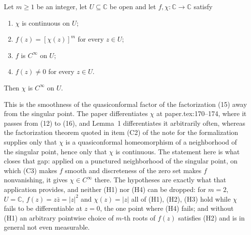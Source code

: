 \begin{lemma}
Let $m\ge1$ be an integer, let $U\subseteq\mathbb{C}$ be open and let
$f,\chi\colon\mathbb{C}\to\mathbb{C}$ satisfy
\begin{enumerate}
\item[(H1)] $\chi$ is continuous on $U$;
\item[(H2)] $f(z)=[\chi(z)]^{m}$ for every $z\in U$;
\item[(H3)] $f$ is $C^\infty$ on $U$;
\item[(H4)] $f(z)\neq0$ for every $z\in U$.
\end{enumerate}
Then $\chi$ is $C^\infty$ on $U$.

This is the smoothness of the quasiconformal factor of the factorization (15)
away from the singular point.  The paper differentiates $\chi$ at
paper.tex:170--174, where it passes from (12) to (16), and Lemma~1
differentiates it arbitrarily often, whereas the factorization theorem quoted
in item (C2) of the note for the formalization supplies only that $\chi$ is a
quasiconformal homeomorphism of a neighborhood of the singular point, hence
only that $\chi$ is continuous.  The statement here is what closes that gap:
applied on a punctured neighborhood of the singular point, on which (C3) makes
$f$ smooth and discreteness of the zero set makes $f$ nonvanishing, it gives
$\chi\in C^\infty$ there.  The hypotheses are exactly what that application
provides, and neither (H1) nor (H4) can be dropped: for $m=2$,
$U=\mathbb{C}$, $f(z)=z\bar z=|z|^{2}$ and $\chi(z)=|z|$ all of (H1), (H2),
(H3) hold while $\chi$ fails to be differentiable at $z=0$, the one point
where (H4) fails; and without (H1) an arbitrary pointwise choice of $m$-th
roots of $f(z)$ satisfies (H2) and is in general not even measurable.
\end{lemma}
